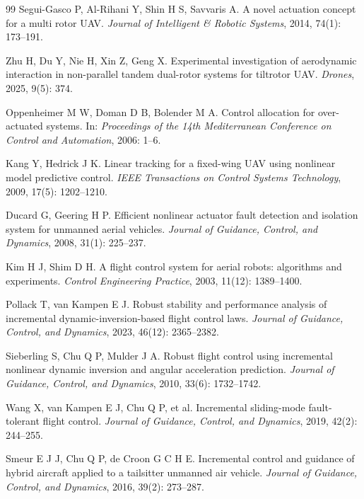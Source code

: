 \begin{thebibliography}{99}
Segui-Gasco P, Al-Rihani Y, Shin H S, Savvaris A.
A novel actuation concept for a multi rotor UAV.
\textit{Journal of Intelligent \& Robotic Systems}, 2014, 74(1): 173--191.

Zhu H, Du Y, Nie H, Xin Z, Geng X.
Experimental investigation of aerodynamic interaction in non-parallel tandem dual-rotor
systems for tiltrotor UAV.
\textit{Drones}, 2025, 9(5): 374.

Oppenheimer M W, Doman D B, Bolender M A.
Control allocation for over-actuated systems.
In: \textit{Proceedings of the 14th Mediterranean Conference on Control and Automation},
2006: 1--6.

Kang Y, Hedrick J K.
Linear tracking for a fixed-wing UAV using nonlinear model predictive control.
\textit{IEEE Transactions on Control Systems Technology}, 2009, 17(5): 1202--1210.

Ducard G, Geering H P.
Efficient nonlinear actuator fault detection and isolation system for unmanned aerial vehicles.
\textit{Journal of Guidance, Control, and Dynamics}, 2008, 31(1): 225--237.

Kim H J, Shim D H.
A flight control system for aerial robots: algorithms and experiments.
\textit{Control Engineering Practice}, 2003, 11(12): 1389--1400.

Pollack T, van Kampen E J.
Robust stability and performance analysis of incremental dynamic-inversion-based flight control laws.
\textit{Journal of Guidance, Control, and Dynamics}, 2023, 46(12): 2365--2382.

Sieberling S, Chu Q P, Mulder J A.
Robust flight control using incremental nonlinear dynamic inversion and angular acceleration prediction.
\textit{Journal of Guidance, Control, and Dynamics}, 2010, 33(6): 1732--1742.

Wang X, van Kampen E J, Chu Q P, et al.
Incremental sliding-mode fault-tolerant flight control.
\textit{Journal of Guidance, Control, and Dynamics}, 2019, 42(2): 244--255.

Smeur E J J, Chu Q P, de Croon G C H E.
Incremental control and guidance of hybrid aircraft applied to a tailsitter unmanned air vehicle.
\textit{Journal of Guidance, Control, and Dynamics}, 2016, 39(2): 273--287.


\end{thebibliography}
